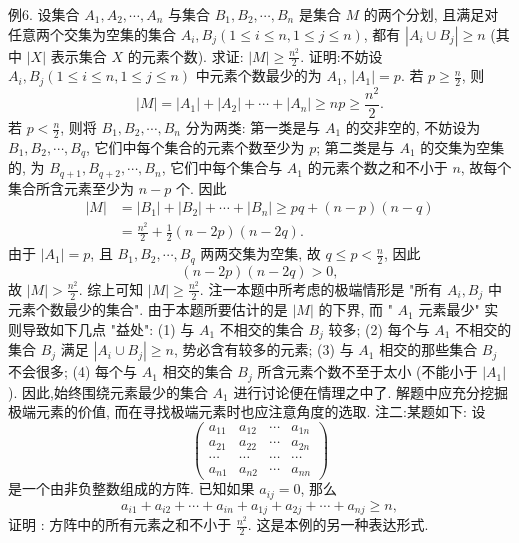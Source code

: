 例6. 设集合 $A_1, A_2, \cdots, A_n$ 与集合 $B_1, B_2, \cdots, B_n$ 是集合 $M$ 的两个分划, 且满足对任意两个交集为空集的集合 $A_i, B_j(1 \leqslant i \leqslant n, 1 \leqslant j \leqslant n)$, 都有 $\left|A_i \cup B_j\right| \geqslant n$ (其中 $|X|$ 表示集合 $X$ 的元素个数). 求证: $|M| \geqslant \frac{n^2}{2}$.
证明:不妨设 $A_i, B_j(1 \leqslant i \leqslant n, 1 \leqslant j \leqslant n)$ 中元素个数最少的为 $A_1$, $\left|A_1\right|=p$.
若 $p \geqslant \frac{n}{2}$, 则
$$
|M|=\left|A_1\right|+\left|A_2\right|+\cdots+\left|A_n\right| \geqslant n p \geqslant \frac{n^2}{2} .
$$
若 $p<\frac{n}{2}$, 则将 $B_1, B_2, \cdots, B_n$ 分为两类: 第一类是与 $A_1$ 的交非空的, 不妨设为 $B_1, B_2, \cdots, B_q$, 它们中每个集合的元素个数至少为 $p$; 第二类是与 $A_1$ 的交集为空集的, 为 $B_{q+1}, B_{q+2}, \cdots, B_n$, 它们中每个集合与 $A_1$ 的元素个数之和不小于 $n$, 故每个集合所含元素至少为 $n-p$ 个.
因此
$$
\begin{aligned}
|M| & =\left|B_1\right|+\left|B_2\right|+\cdots+\left|B_n\right| \geqslant p q+(n-p)(n-q) \\
& =\frac{n^2}{2}+\frac{1}{2}(n-2 p)(n-2 q) .
\end{aligned}
$$
由于 $\left|A_1\right|=p$, 且 $B_1, B_2, \cdots, B_q$ 两两交集为空集, 故 $q \leqslant p<\frac{n}{2}$, 因此
$$
(n-2 p)(n-2 q)>0,
$$
故 $|M|>\frac{n^2}{2}$.
综上可知 $|M| \geqslant \frac{n^2}{2}$.
注一本题中所考虑的极端情形是 "所有 $A_i, B_j$ 中元素个数最少的集合". 由于本题所要估计的是 $|M|$ 的下界, 而 " $A_1$ 元素最少" 实则导致如下几点 "益处":
(1) 与 $A_1$ 不相交的集合 $B_j$ 较多;
(2) 每个与 $A_1$ 不相交的集合 $B_j$ 满足 $\left|A_i \cup B_j\right| \geqslant n$, 势必含有较多的元素;
(3) 与 $A_1$ 相交的那些集合 $B_j$ 不会很多;
(4) 每个与 $A_1$ 相交的集合 $B_j$ 所含元素个数不至于太小 (不能小于 $\left|A_1\right|$ ). 因此,始终围绕元素最少的集合 $A_1$ 进行讨论便在情理之中了.
解题中应充分挖掘极端元素的价值, 而在寻找极端元素时也应注意角度的选取.
注二:某题如下:
设
$$
\left(\begin{array}{cccc}
a_{11} & a_{12} & \cdots & a_{1 n} \\
a_{21} & a_{22} & \cdots & a_{2 n} \\
\cdots & \cdots & \cdots & \cdots \\
a_{n 1} & a_{n 2} & \cdots & a_{n n}
\end{array}\right)
$$
是一个由非负整数组成的方阵.
已知如果 $a_{i j}=0$, 那么
$$
a_{i 1}+a_{i 2}+\cdots+a_{i n}+a_{1 j}+a_{2 j}+\cdots+a_{n j} \geqslant n,
$$
证明 : 方阵中的所有元素之和不小于 $\frac{n^2}{2}$.
这是本例的另一种表达形式.




